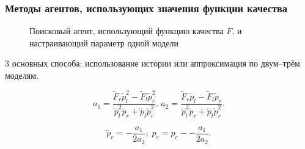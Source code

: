 \documentclass[10pt,utf8]{beamer}
\newlength\TW
\begin{document}

\begin{frame}
  \frametitle{Методы агентов, использующих значения функции качества}

  \begin{figure}[htb!]
    \begin{center}
      
    \end{center}
    \caption{Поисковый агент, использующий функцию качества $F$, и настраивающий параметр одной модели}
    \label{atu:f:agent1}
  \end{figure}

  \vspace{-4ex}
  3 основных способа: использование истории или аппроксимация по двум--трём моделям.

  \[
    a_1 = \frac{\tilde{F}_r \tilde{p}_l^2 - \tilde{F}_l \tilde{p}_r^2 }
             { \tilde{p}_l^2 \tilde{p}_r  + \tilde{p}_l \tilde{p}_r^2 }.
    \;
  a_2 = \frac{\tilde{F}_r \tilde{p}_l - \tilde{F}_l \tilde{p}_r }
             { \tilde{p}_l^2 \tilde{p}_r  + \tilde{p}_l \tilde{p}_r^2 }.
  \]

\begin{equation}
  \tilde{p}_e = - \frac{a_1}{2 a_2};
  \;
  p_e = p_c -- \frac{a_1}{2 a_2}.
  \label{atu:eq:p_F_e}
\end{equation}

\end{frame}


%
%
%
%         
%
%


\end{document}
